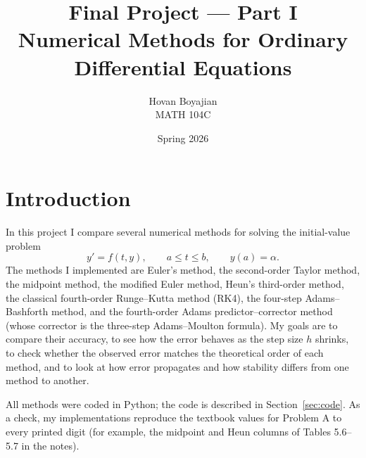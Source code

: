 \documentclass[11pt]{article}
\title{\vspace{-1.5em}\textbf{Final Project --- Part I}\\[0.2em]
\large Numerical Methods for Ordinary Differential Equations}
\author{Hovan Boyajian \\ \small MATH 104C}
\date{Spring 2026}
\begin{document}
\maketitle

\section{Introduction}
In this project I compare several numerical methods for solving the
initial-value problem
\[
y' = f(t,y), \qquad a \le t \le b, \qquad y(a) = \alpha .
\]
The methods I implemented are Euler's method, the second-order Taylor method,
the midpoint method, the modified Euler method, Heun's third-order method, the
classical fourth-order Runge--Kutta method (RK4), the four-step
Adams--Bashforth method, and the fourth-order Adams predictor--corrector method
(whose corrector is the three-step Adams--Moulton formula). My goals are to
compare their accuracy, to see how the error behaves as the step size $h$
shrinks, to check whether the observed error matches the theoretical order of
each method, and to look at how error propagates and how stability differs from
one method to another.

All methods were coded in Python; the code is described in
Section~\ref{sec:code}. As a check, my implementations reproduce the textbook
values for Problem A to every printed digit (for example, the midpoint and Heun
columns of Tables 5.6--5.7 in the notes).
\end{document}
